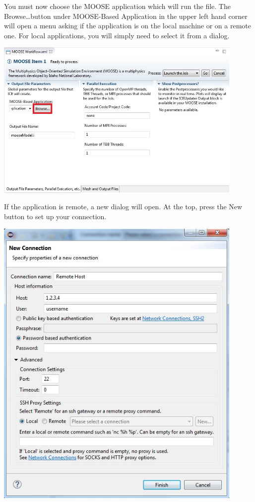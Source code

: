 \documentclass{article}
\begin{document}
You must now choose the MOOSE application which will run the file. The
Browse\ldots button under MOOSE-Based Application in the upper left hand corner
will open a menu asking if the application is on the local machine or on a
remote one. For local applications, you will simply need to select it from a
dialog. 

\begin{center}
\includegraphics[width=12cm]{images/MOOSEItem}
\end{center}

If the application is remote, a new dialog will open. At the top, press the New
button to set up your connection. 

\begin{center}
\includegraphics[width=12cm]{images/NewConnectionDialog}
\end{center}
\end{document}
